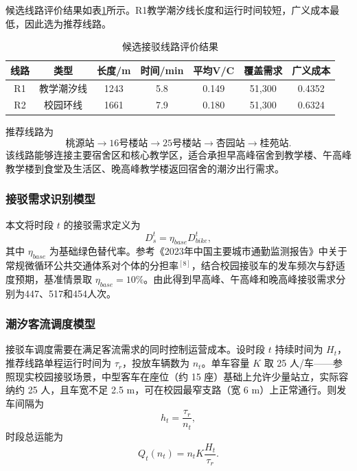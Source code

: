 \documentclass[UTF8,zihao=-4,a4paper]{ctexart}
\numberwithin{table}{section}
\numberwithin{figure}{section}
\numberwithin{equation}{section}
\begin{document}
候选线路评价结果如表\ref{tab:route_eval}所示。R1教学潮汐线长度和运行时间较短，广义成本最低，因此选为推荐线路。

\begin{table}[H]
\footnotesize
\centering
\caption{候选接驳线路评价结果}
\label{tab:route_eval}
\begin{tabular}{ccccccc}
\toprule
\textbf{线路} & \textbf{类型} & \textbf{长度/m} & \textbf{时间/min} & \textbf{平均V/C} & \textbf{覆盖需求} & \textbf{广义成本} \\
\midrule
R1 & 教学潮汐线 & 1243 & 5.8 & 0.149 & 51,300 & 0.4352 \\
R2 & 校园环线 & 1661 & 7.9 & 0.180 & 51,300 & 0.6324 \\
\bottomrule
\end{tabular}
\end{table}

推荐线路为
\begin{equation}
\text{桃源站}\rightarrow\text{16号楼站}\rightarrow\text{25号楼站}\rightarrow\text{杏园站}\rightarrow\text{桂苑站}.
\end{equation}
该线路能够连接主要宿舍区和核心教学区，适合承担早高峰宿舍到教学楼、午高峰教学楼到食堂及生活区、晚高峰教学楼返回宿舍的潮汐出行需求。

\subsubsection{接驳需求识别模型}

本文将时段 $t$ 的接驳需求定义为
\begin{equation}
D_s^t=\eta_{base}D_{bike}^t,
\end{equation}
其中 $\eta_{base}$ 为基础绿色替代率。参考《2023年中国主要城市通勤监测报告》中关于常规微循环公共交通体系对个体的分担率$^{[8]}$，结合校园接驳车的发车频次与舒适度预期，基准情景取 $\eta_{base}=10\%$。由此得到早高峰、午高峰和晚高峰接驳需求分别为447、517和454人次。

\subsubsection{潮汐客流调度模型}

接驳车调度需要在满足客流需求的同时控制运营成本。设时段 $t$ 持续时间为 $H_t$，推荐线路单程运行时间为 $\tau_r$，投放车辆数为 $n_t$。单车容量 $K$ 取 25 人/车——参照现实校园接驳场景，中型客车在座位（约 15 座）基础上允许少量站立，实际容纳约 25 人，且车宽不足 2.5 m，可在校园最窄支路（宽 6 m）上正常通行。则发车间隔为
\begin{equation}
h_t=\frac{\tau_r}{n_t},
\end{equation}
时段总运能为
\begin{equation}
Q_t(n_t)=n_tK\frac{H_t}{\tau_r}.
\end{equation}
\end{document}
